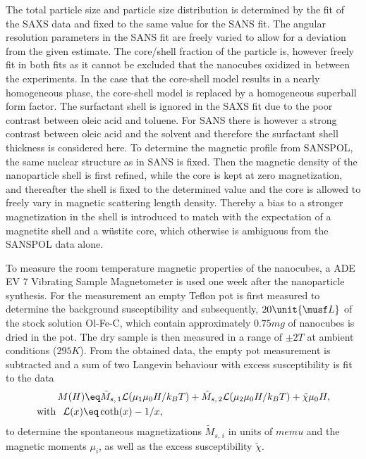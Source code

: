 \documentclass[\main/dresen_thesis.tex]{subfiles}
\begin{document}
    The total particle size and particle size distribution is determined by the fit of the SAXS data and fixed to the same value for the SANS fit.
    The angular resolution parameters in the SANS fit are freely varied to allow for a deviation from the given estimate.
    The core/shell fraction of the particle is, however freely fit in both fits as it cannot be excluded that the nanocubes oxidized in between the experiments.
    In the case that the core-shell model results in a nearly homogeneous phase, the core-shell model is replaced by a homogeneous superball form factor.
    The surfactant shell is ignored in the SAXS fit due to the poor contrast between oleic acid and toluene.
    For SANS there is however a strong contrast between oleic acid and the solvent and therefore the surfactant shell thickness is considered here.
    To determine the magnetic profile from SANSPOL, the same nuclear structure as in SANS is fixed.
    Then the magnetic density of the nanoparticle shell is first refined, while the core is kept at zero magnetization, and thereafter the shell is fixed to the determined value and the core is allowed to freely vary in magnetic scattering length density.
    Thereby a bias to a stronger magnetization in the shell is introduced to match with the expectation of a magnetite shell and a w\"ustite core, which otherwise is ambiguous from the SANSPOL data alone.

    To measure the room temperature magnetic properties of the nanocubes, a ADE EV 7 Vibrating Sample Magnetometer is used one week after the nanoparticle synthesis.
    For the measurement an empty Teflon pot is first measured to determine the background susceptibility and subsequently, $20 \unit{\musf L}$ of the stock solution Ol-Fe-C, which contain approximately $0.75 \unit{mg}$ of nanocubes is dried in the pot.
    The dry sample is then measured in a range of $\pm 2 \unit{T}$ at ambient conditions ($295 \unit{K}$).
    From the obtained data, the empty pot measurement is subtracted and a sum of two Langevin behaviour with excess susceptibility is fit to the data
    \begin{align}
      \begin{split}
        &M(H) \eq \tilde{M}_{s,\,1} \mathcal{L}( \mu_1 \mu_0 H / k_B T) + \tilde{M}_{s,\,2}  \mathcal{L}(  \mu_2 \mu_0 H / k_B T) + \tilde{\chi} \mu_0H,\\
        \mathrm{with\,} & \hspace{0.2cm} \mathcal{L}(x) \eq \coth(x) - 1/x,
      \end{split}
    \end{align}
    to determine the spontaneous magnetizations $\tilde{M}_{s,\,i}$ in units of $\unit{memu}$ and the magnetic moments $\mu_i$, as well as the excess susceptibility $\tilde{\chi}$.
    
\end{document}
